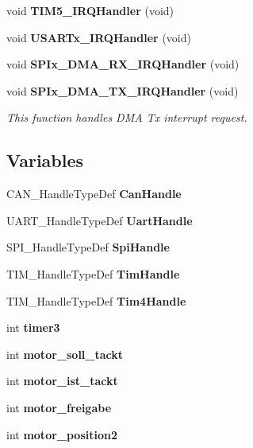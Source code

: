 \begin{DoxyCompactItemize}
\item 
void \textbf{ T\+I\+M5\+\_\+\+I\+R\+Q\+Handler} (void)
\item 
void \textbf{ U\+S\+A\+R\+Tx\+\_\+\+I\+R\+Q\+Handler} (void)
\item 
void \textbf{ S\+P\+Ix\+\_\+\+D\+M\+A\+\_\+\+R\+X\+\_\+\+I\+R\+Q\+Handler} (void)
\item 
void \textbf{ S\+P\+Ix\+\_\+\+D\+M\+A\+\_\+\+T\+X\+\_\+\+I\+R\+Q\+Handler} (void)
\begin{DoxyCompactList}\small\item\em This function handles D\+MA Tx interrupt request. \end{DoxyCompactList}\end{DoxyCompactItemize}
\subsection*{Variables}
\begin{DoxyCompactItemize}
\item 
C\+A\+N\+\_\+\+Handle\+Type\+Def \textbf{ Can\+Handle}
\item 
U\+A\+R\+T\+\_\+\+Handle\+Type\+Def \textbf{ Uart\+Handle}
\item 
S\+P\+I\+\_\+\+Handle\+Type\+Def \textbf{ Spi\+Handle}
\item 
T\+I\+M\+\_\+\+Handle\+Type\+Def \textbf{ Tim\+Handle}
\item 
T\+I\+M\+\_\+\+Handle\+Type\+Def \textbf{ Tim4\+Handle}
\item 
int \textbf{ timer3}
\item 
int \textbf{ motor\+\_\+soll\+\_\+tackt}
\item 
int \textbf{ motor\+\_\+ist\+\_\+tackt}
\item 
int \textbf{ motor\+\_\+freigabe}
\item 
int \textbf{ motor\+\_\+position2}
\end{DoxyCompactItemize}
